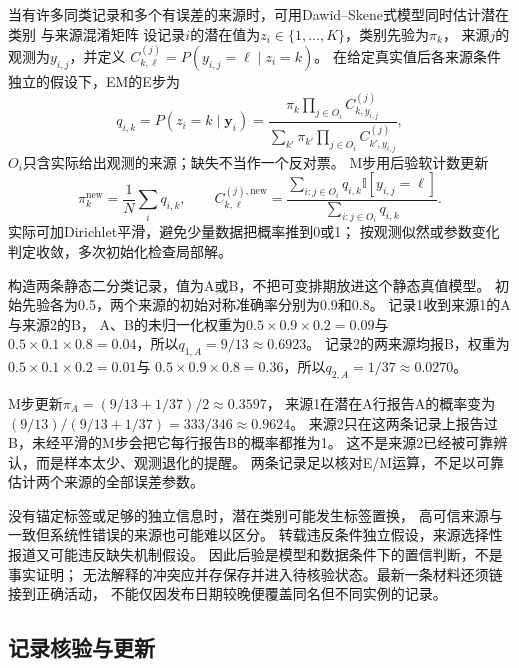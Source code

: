 当有许多同类记录和多个有误差的来源时，可用Dawid--Skene式模型同时估计潜在类别
与来源混淆矩阵
设记录$i$的潜在值为$z_i\in\{1,\ldots,K\}$，类别先验为$\pi_k$，
来源$j$的观测为$y_{i,j}$，并定义
$C^{(j)}_{k,\ell}=P(y_{i,j}=\ell\mid z_i=k)$。
在给定真实值后各来源条件独立的假设下，EM的E步为
\begin{equation}
  q_{i,k}=P(z_i=k\mid \bm{y}_i)=
  \frac{\pi_k\prod_{j\in O_i}C^{(j)}_{k,y_{i,j}}}
       {\sum_{k'}\pi_{k'}\prod_{j\in O_i}C^{(j)}_{k',y_{i,j}}},
  \label{eq:nlp-extraction-ds-e}
\end{equation}
$O_i$只含实际给出观测的来源；缺失不当作一个反对票。
M步用后验软计数更新
\begin{equation}
  \pi_k^{\mathrm{new}}=\frac{1}{N}\sum_iq_{i,k},
  \qquad
  C^{(j),\mathrm{new}}_{k,\ell}=
  \frac{\sum_{i:j\in O_i}q_{i,k}\mathbb{I}[y_{i,j}=\ell]}
       {\sum_{i:j\in O_i}q_{i,k}}.
  \label{eq:nlp-extraction-ds-m}
\end{equation}
实际可加Dirichlet平滑，避免少量数据把概率推到0或1；
按观测似然或参数变化判定收敛，多次初始化检查局部解。

\begin{example}[一次来源后验与参数更新]
\label{ex:nlp-extraction-ds}
构造两条静态二分类记录，值为A或B，不把可变排期放进这个静态真值模型。
初始先验各为0.5，两个来源的初始对称准确率分别为0.9和0.8。
记录1收到来源1的A与来源2的B，
A、B的未归一化权重为$0.5\times0.9\times0.2=0.09$与
$0.5\times0.1\times0.8=0.04$，所以$q_{1,A}=9/13\approx0.6923$。
记录2的两来源均报B，权重为$0.5\times0.1\times0.2=0.01$与
$0.5\times0.9\times0.8=0.36$，所以$q_{2,A}=1/37\approx0.0270$。

M步更新$\pi_A=(9/13+1/37)/2\approx0.3597$，
来源1在潜在A行报告A的概率变为
$(9/13)/(9/13+1/37)=333/346\approx0.9624$。
来源2只在这两条记录上报告过B，未经平滑的M步会把它每行报告B的概率都推为1。
这不是来源2已经被可靠辨认，而是样本太少、观测退化的提醒。
两条记录足以核对E/M运算，不足以可靠估计两个来源的全部误差参数。
\end{example}

没有锚定标签或足够的独立信息时，潜在类别可能发生标签置换，
高可信来源与一致但系统性错误的来源也可能难以区分。
转载违反条件独立假设，来源选择性报道又可能违反缺失机制假设。
因此后验是模型和数据条件下的置信判断，不是事实证明；
无法解释的冲突应并存保存并进入待核验状态。最新一条材料还须链接到正确活动，
不能仅因发布日期较晚便覆盖同名但不同实例的记录。

\subsection{记录核验与更新}
\label{sec:nlp-extraction-update}

